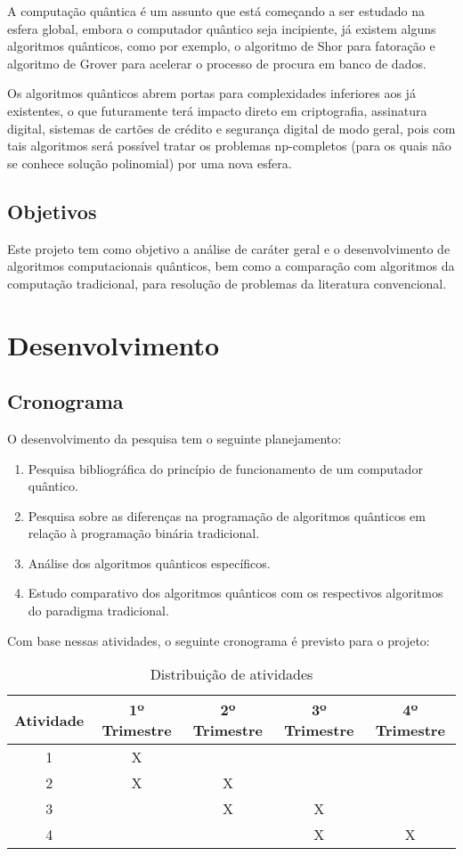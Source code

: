 \documentclass{imetex-inci}
\begin{document}
 A computação quântica é um assunto que está começando a ser estudado na esfera global, embora o computador quântico seja incipiente, já existem alguns algoritmos quânticos, como por exemplo, o algoritmo de Shor para fatoração e algoritmo de Grover para acelerar o processo de procura em banco de dados.
 
 Os algoritmos quânticos abrem portas para complexidades inferiores aos já existentes, o que futuramente terá impacto direto em criptografia, assinatura digital, sistemas de cartões de crédito e segurança digital de modo geral, pois com tais algoritmos será possível tratar os problemas np-completos (para os quais não se conhece solução polinomial) por uma nova esfera.

\section{Objetivos}
Este projeto tem como objetivo a análise de caráter geral e o desenvolvimento de algoritmos computacionais quânticos, bem como a comparação com algoritmos da computação tradicional, para resolução de problemas da literatura convencional.

\chapter{Desenvolvimento}
\section{Cronograma}
O desenvolvimento da pesquisa tem o seguinte planejamento:
\begin{enumerate}
\item Pesquisa bibliográfica do princípio de funcionamento de um computador quântico.
\item Pesquisa sobre as diferenças na programação de algoritmos quânticos em relação à programação binária tradicional.
\item Análise dos algoritmos quânticos específicos.
\item Estudo comparativo dos algoritmos quânticos com os respectivos algoritmos do paradigma tradicional.
\end{enumerate}
Com base nessas atividades, o seguinte cronograma é previsto para o projeto:
\begin{table}[h]
\centering
\begin{tabular}{|c|c|c|c|c|}
\hline 
Atividade & 1º Trimestre & 2º Trimestre & 3º Trimestre & 4º Trimestre \\ 
\hline 
1 & X &   &   &   \\ 
\hline 
2 & X & X &   &   \\ 
\hline 
3 &   & X & X &   \\ 
\hline 
4 &   &   & X & X \\ 
\hline 
\end{tabular}
\caption{Distribuição de atividades}
\end{table}
\end{document}
